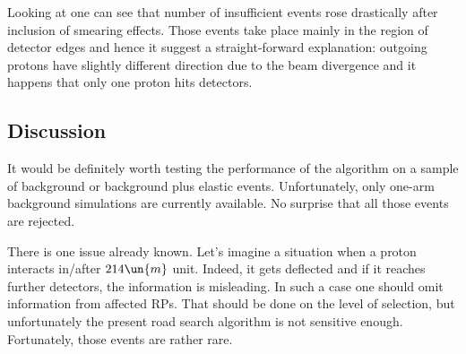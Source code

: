 Looking at  one can see that number of insufficient events rose drastically after inclusion of smearing effects. Those events take place mainly in the region of detector edges and hence it suggest a straight-forward explanation: outgoing protons have slightly different direction due to the beam divergence and it happens that only one proton hits detectors.



\subsection[disc]{Discussion}

It would be definitely worth testing the performance of the algorithm on a sample of background or background plus elastic events. Unfortunately, only one-arm background simulations are currently available. No surprise that all those events are rejected.

There is one issue already known. Let's imagine a situation when a proton interacts in/after $214\un{m}$ unit. Indeed, it gets deflected and if it reaches further detectors, the information is misleading. In such a case one should omit information from affected RPs. That should be done on the level of selection, but unfortunately the present road search algorithm is not sensitive enough. Fortunately, those events are rather rare.

\iffalse
In order to avoid those problems, it is necessary to improve the selection algorithm. Instead of road search algorithm, one can use a proper pattern recognition algorithm with pattern defined by \Eq{track general}. This can be implemented on the level of elastic reconstruction or better a lever lower. Instead of (current) selecting hits RP by RP, this might be done using all hits available. This might be very useful in the case a detector has more than one hit. Using information from other detectors, one may remove the ambiguity in pairing $u$ and $v$ strips. This needs to be discussed.
\fi


